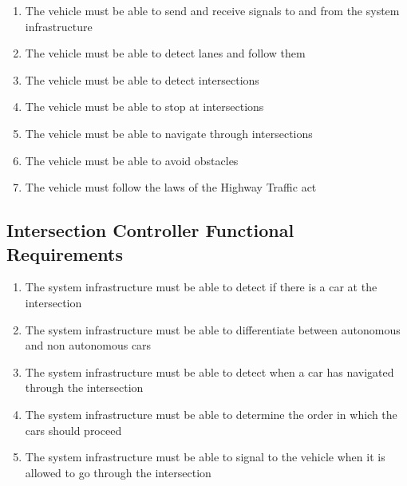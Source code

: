\documentclass [12pt]{article}
\begin{document}
\begin{minipage}{\textwidth}
\begin{enumerate}[label=\textbf{VHL\arabic*:}, leftmargin=0.8in]
	
	\item The vehicle must be able to send and receive signals to and from the system infrastructure
	
	\item The vehicle must be able to detect lanes and follow them
    
    \item The vehicle must be able to detect intersections 
    
    \item The vehicle must be able to stop at intersections
    
    \item The vehicle must be able to navigate through intersections
    
    \item The vehicle must be able to avoid obstacles 
    
    \item The vehicle must follow the laws of the Highway Traffic act
\end{enumerate}
\end{minipage}


\subsection{Intersection Controller Functional Requirements}
\begin{enumerate}[label=\textbf{ITC\arabic*:}, leftmargin=0.8in]

	\item The system infrastructure must be able to detect if there is a car at the intersection
	
	\item The system infrastructure must be able to differentiate between autonomous and non autonomous cars
	
	\item The system infrastructure must be able to detect when a car has navigated through the intersection

    \item The system infrastructure must be able to determine the order in which the cars should proceed
    
    \item The system infrastructure must be able to signal to the vehicle when it is allowed to go through the intersection
\end{enumerate}
\end{document}
